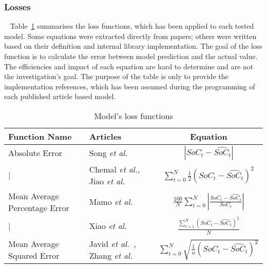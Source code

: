 \subsubsection{Losses}~\label{subsub:losses}
Table~\ref{tab:losses} summarises the loss functions, which has been applied to each tested model.
Some equations were extracted directly from papers; others were written based on their definition and internal library implementation.
The goal of the loss function is to calculate the error between model prediction and the actual value.
The efficiencies and impact of each equation are hard to determine and are not the investigation's goal.
The purpose of the table is only to provide the implementation references, which has been assumed during the programming of each published article based model.
\begin{center}
    \begin{table}[htbp]
    \caption{Model's loss functions}
    \label{tab:losses}
\begin{tabular}{ l l c }
    \hline
    Function Name & Articles & Equation \\ 
    \hline
    Absolute Error & Song \textit{et al.}~\cite{song_lithium-ion_2018} & $|SoC_t-\hat{SoC_t}|$ \\
    \hline
    | & Chemal \textit{et al.}\cite{Chemali2017}, Jiao \textit{et al.}~\cite{jiao_gru-rnn_2020} & $\sum\limits^N_{t=0} \frac{1}{2} (SoC_t-\hat{SoC_t})^2$ \\
    \hline
    Mean Average Percentage Error & Mamo \textit{et al.}~\cite{mamo_long_2020} & $\frac{100}{N}\sum\limits^N_{t=0}|\frac{SoC_t-\hat{SoC_t}}{SoC_t}|$ \\
    \hline
    | & Xiao \textit{et al.}~\cite{xiao_accurate_2019} & $\frac{\sum\limits^N_{t=1}(SoC_t-\hat{SoC_t})^2}{N}$ \\
    \hline
    Mean Average Squared Error & Javid \textit{et al.}~\cite{javid_adaptive_2020}, Zhang \textit{et al.}~\cite{zhang_deep_2020} & $\sum\limits^N_{t=0} \sqrt{\frac{1}{n} (SoC_t-\hat{SoC_t})^2}$ \\
    \hline
\end{tabular}
    \end{table}
\end{center}
